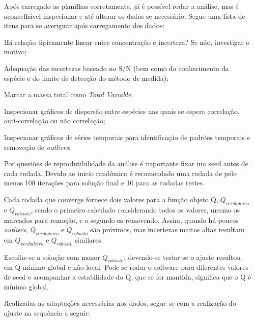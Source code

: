 Após carregado as planilhas corretamente, já é possível rodar a análise, 
mas é aconselhável inspecionar e até alterar os dados se necessário. Segue
uma lista de itens para se averiguar após carregamento dos dados: 

\begin{itemize}
\begin{spacing}{1.0}
  \item Há relação tipicamente linear entre concentração e incerteza?  
        Se não, investigar o motivo;
  \item Adequação das incertezas baseado no S/N (bem como do conhecimento da 
        espécie e do limite de detecção do método de medida); 
  \item Marcar a massa total como \textit{Total Variable};
  \item Inspecionar gráficos de dispersão entre espécies nas quais se espera 
        correlação, anti-correlação ou não correlação; 
  \item Inspecionar gráficos de séries temporais para identificação de padrões 
        temporais e removeção de \textit{outliers}; 
  \end{spacing}
\end{itemize}

Por questões de reprodutibilidade da análise é importante fixar um seed antes 
de cada rodada. Devido ao inicio randômico é recomendado uma rodada de pelo 
menos 100 iterações para solução final e 10 para as rodadas testes. 

Cada rodada que converge fornece dois valores para a função objeto Q, 
$Q_{verdadeiro}$ e $Q_{robusto}$, sendo o primeiro calculado considerando 
todos os valores, mesmo os marcados para remoção, e o segundo os removendo.
Assim, quando há poucos \textit{outliers}, $Q_{verdadeiro}$ e $Q_{robusto}$ 
são próximos, mas incertezas muitos altas resultam em $Q_{verdadeiro}$ e 
$Q_{robusto}$ similares.

Escolhe-se a solução com menor $Q_{robusto}$, devendo-se testar se o ajuste 
resultou em Q mínimo global e não local. Pode-se rodar o software para 
diferentes valores de seed e acompanhar a estabilidade do Q, que se for mantida, 
significa que o Q é mínimo global.  

Realizadas as adaptações necessárias nos dados, segue-se com a realização 
do ajuste na sequência a seguir:

